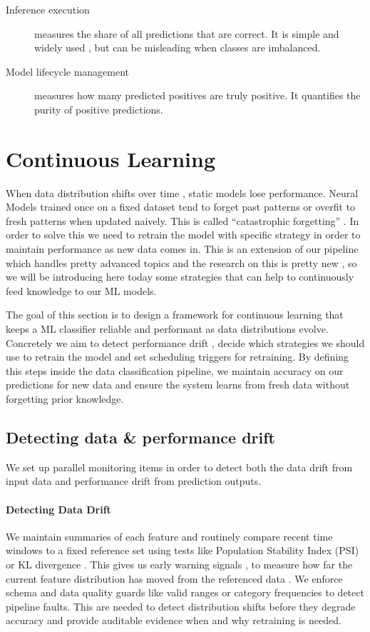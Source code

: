 \begin{description}
  \item[Inference execution] measures the share of all predictions that are correct. It is simple and widely used , but can be misleading when classes are imbalanced.
  \item[Model lifecycle management] measures how many predicted positives are truly positive. It quantifies the purity of positive predictions.
\end{description}

\section{Continuous Learning}

When data distribution shifts over time , static models lose performance. Neural Models trained once on a fixed dataset tend to forget past patterns or overfit to fresh patterns when updated naively. This is called “catastrophic forgetting” \cite{chrysakis:2020}. In order to solve this we need to retrain the model with specific strategy in order to maintain performance as new data comes in. This is an extension of our pipeline which handles pretty advanced topics and the research on this is pretty new , so we will be introducing here today some strategies that can help to continuously feed knowledge to our ML models.
\smallskip

The goal of this section is to design a framework for continuous learning that keeps a ML classifier reliable and performant as data distributions evolve. Concretely we aim to detect performance drift , decide which strategies we should use to retrain the model and set scheduling triggers for retraining. By defining this steps inside the data classification pipeline, we maintain accuracy on our predictions for new data and ensure the system learns from fresh data without forgetting prior knowledge.

\subsection{Detecting data \& performance drift}
We set up parallel monitoring items in order to detect both the data drift from input data and performance drift from prediction outputs.

\paragraph{Detecting Data Drift}
We maintain summaries of each feature and routinely compare recent time windows to a fixed reference set using tests like Population Stability Index (PSI) or KL divergence \cite{cossu:202}. This gives us early warning signals , to measure how far the current feature distribution has moved from the referenced data . We enforce schema and data quality guards like valid ranges or category frequencies to detect pipeline faults. This are needed to detect distribution shifts before they degrade accuracy and provide auditable evidence when and why retraining is needed.

